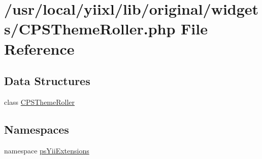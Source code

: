 \hypertarget{CPSThemeRoller_8php}{
\section{/usr/local/yiixl/lib/original/widgets/CPSThemeRoller.php File Reference}
\label{CPSThemeRoller_8php}
}
\subsection*{Data Structures}
\begin{DoxyCompactItemize}
\item 
class \hyperlink{classCPSThemeRoller}{CPSThemeRoller}
\end{DoxyCompactItemize}
\subsection*{Namespaces}
\begin{DoxyCompactItemize}
\item 
namespace \hyperlink{namespacepsYiiExtensions}{psYiiExtensions}
\end{DoxyCompactItemize}
